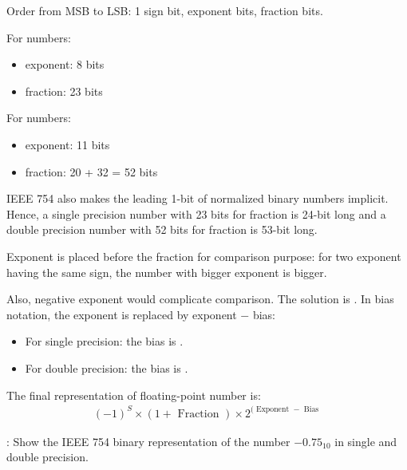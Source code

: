     \par Order from MSB to LSB: 1 sign bit, exponent bits, fraction bits.
    \par For  numbers:
      \begin{itemize}
        \item exponent: 8 bits
        \item fraction: 23 bits
      \end{itemize}
    \par For  numbers:
      \begin{itemize}
        \item exponent: 11 bits
        \item fraction: 20 + 32 = 52 bits
      \end{itemize}
    \par IEEE 754 also makes the leading 1-bit of normalized binary numbers
      implicit. Hence, a single precision number with 23 bits for fraction is
      24-bit long and a double precision number with 52 bits for fraction is
      53-bit long.
    \par Exponent is placed before the fraction for comparison purpose: for two
      exponent having the same sign, the number with bigger exponent is bigger.
    \par Also, negative exponent would complicate comparison. The solution is
      . In bias notation, the exponent is replaced by
      exponent $-$ bias:
      \begin{itemize}
        \item For single precision: the bias is .
        \item For double precision: the bias is .
      \end{itemize}
    \par The final representation of floating-point number is:
        \begin{align*}
          (-1)^{S} \times (1 + \mbox{ Fraction }) \times 2^{(\mbox{ Exponent }
          - \mbox{ Bias }}
        \end{align*}
    \par {}: Show the IEEE 754 binary representation of the number
      $-0.75_{10}$ in single and double precision.
